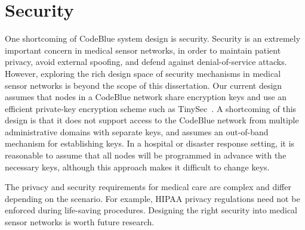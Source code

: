 \section{Security}

One shortcoming of CodeBlue system design is security.  Security is
an extremely important concern in medical sensor networks, in order to
maintain patient privacy, avoid external spoofing, and defend against
denial-of-service attacks. However, exploring the rich design space of
security mechanisms in medical sensor networks is beyond the scope of
this dissertation. Our current design assumes that nodes in a CodeBlue
network share encryption keys and use an efficient private-key
encryption scheme such as TinySec~\cite{tinysec}.  A shortcoming of
this design is that it does not support access to the CodeBlue network
from multiple administrative domains with separate keys, and assumes
an out-of-band mechanism for establishing keys.  In a hospital or
disaster response setting, it is reasonable to assume that all nodes
will be programmed in advance with the necessary keys, although this
approach makes it difficult to change keys.

The privacy and security requirements for medical care are
complex and differ depending on the scenario. For example, HIPAA privacy
regulations need not be enforced during life-saving procedures. Designing
the right security into medical sensor networks is worth future research.

